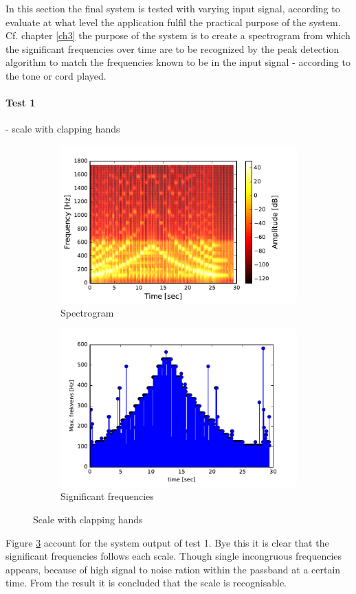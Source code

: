 In this section the final system is tested with varying input signal, according to evaluate at what level the application fulfil the practical purpose of the system. Cf. chapter \ref{ch3} the purpose of the system is to create a spectrogram from which the significant frequencies over time are to be recognized by the peak detection algorithm to match the frequencies known to be in the input signal - according to the tone or cord played.
\paragraph{Test 1} - scale with clapping hands
\begin{figure}[H]
\centering
\begin{subfigure}{0.49\textwidth}
\centering
\includegraphics[width=\textwidth]{figures/validation/systemtest/final_spec.pdf}
\caption{Spectrogram}
\label{fig:final_spec1}
\end{subfigure}
\begin{subfigure}{0.49\textwidth}
\centering
\includegraphics[width=\textwidth]{figures/validation/systemtest/final_peak.pdf}
\caption{Significant frequencies}
\label{fig:final_peak1}
\end{subfigure}
\label{fig:final_1}
\caption{Scale with clapping hands}
\end{figure} 
Figure \ref{fig:final_1} account for the system output of test 1. Bye this it is clear that the significant frequencies follows each scale. Though single incongruous frequencies appears, because of high signal to noise ration within the passband at a certain time. From the result it is concluded that the scale is recognisable.   
